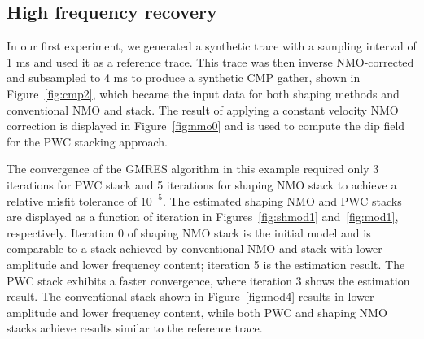 \subsection{High frequency recovery}

In our first experiment, we generated a synthetic trace with a sampling interval of 1 ms and 
used it as a reference trace. This trace was then inverse NMO-corrected and subsampled to 4 ms 
to produce a synthetic CMP gather, shown in Figure~\ref{fig:cmp2}, which became the input data for both 
shaping methods and conventional NMO and stack. The result of applying a constant velocity NMO 
correction is displayed in Figure~\ref{fig:nmo0} and is used to compute
the dip field for the PWC stacking approach.

	
The convergence of the GMRES algorithm in this example required only 3 iterations for PWC stack and 5 iterations for 
shaping NMO stack to achieve a relative misfit tolerance of $10^{-5}$.
The estimated shaping NMO and PWC stacks are displayed as a function of iteration in Figures~\ref{fig:shmod1} and~\ref{fig:mod1}, respectively.
Iteration 0 of shaping NMO stack is the initial model and is comparable to a stack achieved by conventional NMO and stack 
with lower amplitude and lower frequency content; iteration 5 is the estimation result. The PWC stack 
exhibits a faster convergence, where iteration 3 shows the estimation result. The conventional stack shown in Figure~\ref{fig:mod4}
results in lower amplitude and lower frequency content, while both PWC and shaping NMO stacks achieve results similar to the 
reference trace.



